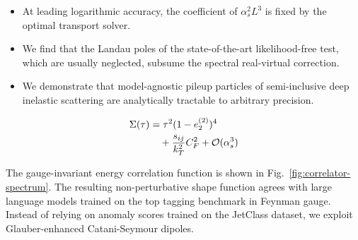 \begin{itemize}
  \item At leading logarithmic accuracy, the coefficient of $\alpha_s^2 L^3$ is fixed by the optimal transport solver.
  \item We find that the Landau poles of the state-of-the-art likelihood-free test, which are usually neglected, subsume the spectral real-virtual correction.
  \item We demonstrate that model-agnostic pileup particles of semi-inclusive deep inelastic scattering are analytically tractable to arbitrary precision.
\end{itemize}

\begin{align}
  \Sigma(\tau) &= {\tau}^{2} (1 - e_2^{(2)})^{4} \nonumber \\
  &\quad + \frac{s_{ij}}{k_T^2} C_F^2 + \mathcal{O}(\alpha_s^3) \label{eq:3}
\end{align}

The gauge-invariant energy correlation function is shown in
Fig.~\ref{fig:correlator-spectrum}. The resulting non-perturbative shape
function agrees with large language models trained on the top tagging
benchmark in Feynman gauge. Instead of relying on anomaly scores trained
on the JetClass dataset, we exploit Glauber-enhanced Catani-Seymour
dipoles.

